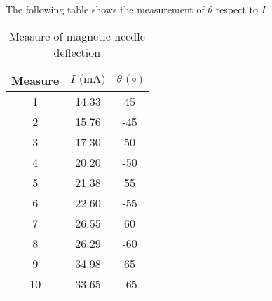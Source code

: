 The following table shows the measurement of $\theta$ respect to $I$
\begin{table}[!htbp]
    {\par\centering
    \begin{tabular}{ccc}
        \hline
        Measure & $I \text{ (mA)}$ & $\theta \text{ (} \circ \text{)}$ \\
        \hline
        1   &    14.33&    45\\
        2   &    15.76&   -45\\
        3   &    17.30&    50\\
        4   &    20.20&   -50\\
        5   &    21.38&    55\\
        6   &    22.60&   -55\\
        7   &    26.55&    60\\
        8   &    26.29&   -60\\
        9   &    34.98&    65\\
        10  &    33.65&   -65\\
        \hline
    \end{tabular}
    \par}
    \caption{Measure of magnetic needle deflection}
\end{table}
